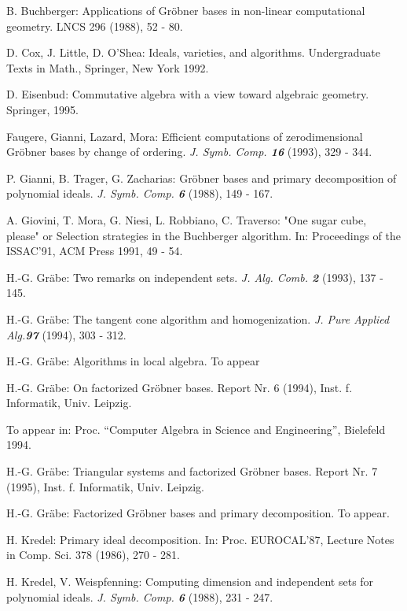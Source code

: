 \begin{thebibliography}{999}
 B. Buchberger: Applications of Gr\"obner bases in non-linear
computational geometry. LNCS 296 (1988), 52 - 80.

 D. Cox, J. Little, D. O'Shea: Ideals, varieties, and
algorithms.  Undergraduate Texts in Math., Springer, New York 1992.

 D. Eisenbud: Commutative algebra with a view toward
algebraic geometry. Springer, 1995. 

 Faugere, Gianni, Lazard, Mora: Efficient computations
of zerodimensional Gr\"obner bases by change of ordering. {\it
J. Symb. Comp. \textbf{16}} (1993), 329 - 344. 

 P. Gianni, B. Trager, G. Zacharias: Gr\"obner bases and
primary decomposition of polynomial ideals. \textit{J. Symb. Comp. \textbf{6}}
 (1988), 149 - 167.

 A. Giovini, T. Mora, G. Niesi, L. Robbiano, C.
Traverso: "One sugar cube, please" or Selection strategies in the
Buchberger algorithm. In: Proceedings of the ISSAC'91, ACM Press
1991, 49 - 54.

 H.-G. Gr\"abe: Two remarks on independent sets.
\textit{J. Alg. Comb. \textbf{2}} (1993), 137 - 145. 

 H.-G. Gr\"abe: The tangent cone algorithm and
homogenization. \textit{J. Pure Applied Alg.\textbf{97}} (1994), 303 - 312.

 H.-G. Gr\"abe: Algorithms in local algebra. To appear

 H.-G. Gr\"abe: On factorized Gr\"obner bases. Report Nr. 6
(1994), Inst. f. Informatik, Univ. Leipzig.

To appear in: Proc. ``Computer Algebra in Science and Engineering'',
Bielefeld 1994.

 H.-G. Gr\"abe: Triangular systems and factorized Gr\"obner
bases. Report Nr. 7 (1995), Inst. f. Informatik, Univ. Leipzig.

 H.-G. Gr\"abe: Factorized Gr\"obner bases and primary
decomposition. To appear. 

 H. Kredel: Primary ideal decomposition. In: Proc.
EUROCAL'87, Lecture Notes in Comp. Sci. 378 (1986), 270 - 281.

 H. Kredel, V. Weispfenning: Computing dimension and
independent sets for polynomial ideals. \textit{J. Symb. Comp. \textbf{6}} 
(1988), 231 - 247.


\end{thebibliography}
